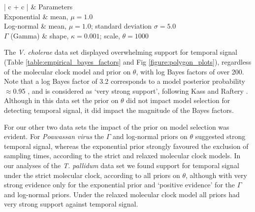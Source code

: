 \documentclass[10pt,letterpaper]{article}
\newlength\savedwidth
\newcommand\thickhline{\noalign{\global\savedwidth\arrayrulewidth\global\arrayrulewidth 2pt}%
\hline
\noalign{\global\arrayrulewidth\savedwidth}}
\begin{document}
\begin{table}[h]
\caption{Prior distributions for the effective population size of the constant-size coalescent (known as $\theta$ and different to the scale parameter of the $\Gamma$ distribution).}
\begin{center} 
	\label{table:prior_distros_on_Phi}
	\begin{tabular}{| c + c |}
    \hline
		 & Parameters\\ \thickhline
		Exponential & mean, $\mu=1.0$\\ \hline
		Log-normal & mean, $\mu=1.0$; standard deviation $\sigma=5.0$\\ \hline
		$\Gamma$ (Gamma) & shape, $\kappa=0.001$; scale, $\theta=1000$\\ \hline
	\end{tabular}
\end{center}
\end{table}

The \textit{V. cholerae} data set displayed overwhelming support for temporal signal (Table \ref{table:empirical_bayes_factors} and Fig \ref{figure:polygon_plots}), regardless of the molecular clock model and prior on $\theta$, with log Bayes factors of over 200. Note that a log Bayes factor of 3.2 corresponds to a model posterior probability $\approx$0.95 \cite{tay2023detecting}, and is considered as `very strong support', following Kass and Raftery \cite{kass1995bayes}. Although in this data set the prior on $\theta$ did not impact model selection for detecting temporal signal, it did impact the magnitude of the Bayes factors.

For our other two data sets the impact of the prior on model selection was evident. For \textit{Poawassan virus} the $\Gamma$ and log-normal priors on $\theta$ suggested strong temporal signal, whereas the exponential prior strongly favoured the exclusion of sampling times, according to the strict and relaxed molecular clock models. In our analyses of the \textit{T. pallidum}  data set we found support for temporal signal under the strict molecular clock, according to all priors on $\theta$, although with very strong evidence only for the exponential prior and `positive evidence' for the $\Gamma$ and log-normal priors. Under the relaxed molecular clock model all priors had very strong support against temporal signal.
\end{document}
